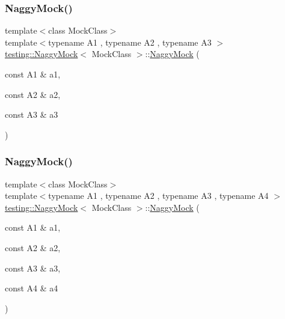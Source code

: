 \mbox{\label{classtesting_1_1_naggy_mock_abd9eea0573bf39f4b41504b2d1df5311}} 
\subsubsection{\texorpdfstring{Naggy\+Mock()}{NaggyMock()}\hspace{0.1cm}{\footnotesize\ttfamily [4/11]}}
{\footnotesize\ttfamily template$<$class Mock\+Class$>$ \\
template$<$typename A1 , typename A2 , typename A3 $>$ \\
\hyperlink{classtesting_1_1_naggy_mock}{testing\+::\+Naggy\+Mock}$<$ Mock\+Class $>$\+::\hyperlink{classtesting_1_1_naggy_mock}{Naggy\+Mock} (\begin{DoxyParamCaption}\item[{const A1 \&}]{a1,  }\item[{const A2 \&}]{a2,  }\item[{const A3 \&}]{a3 }\end{DoxyParamCaption})\hspace{0.3cm}{\ttfamily [inline]}}

\mbox{\label{classtesting_1_1_naggy_mock_aa7d63f62600171db931c6bbb4c2a6d52}} 
\subsubsection{\texorpdfstring{Naggy\+Mock()}{NaggyMock()}\hspace{0.1cm}{\footnotesize\ttfamily [5/11]}}
{\footnotesize\ttfamily template$<$class Mock\+Class$>$ \\
template$<$typename A1 , typename A2 , typename A3 , typename A4 $>$ \\
\hyperlink{classtesting_1_1_naggy_mock}{testing\+::\+Naggy\+Mock}$<$ Mock\+Class $>$\+::\hyperlink{classtesting_1_1_naggy_mock}{Naggy\+Mock} (\begin{DoxyParamCaption}\item[{const A1 \&}]{a1,  }\item[{const A2 \&}]{a2,  }\item[{const A3 \&}]{a3,  }\item[{const A4 \&}]{a4 }\end{DoxyParamCaption})\hspace{0.3cm}{\ttfamily [inline]}}

